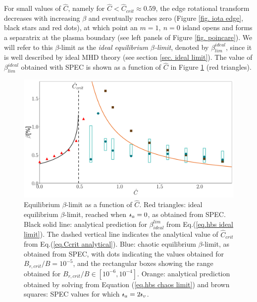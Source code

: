 \documentclass[my_thesis.tex]{subfiles}
\begin{document}
For small values of $\hat{C}$, namely for $\hat{C} < \hat{C}_{crit}\approx 0.59$, the edge rotational transform decreases with increasing $\beta$ and eventually reaches zero (Figure \ref{fig. iota edge}, black stars and red dots), at which point an $m=1,\ n=0$ island opens and forms a separatrix at the plasma boundary (see left panels of Figure \ref{fig. poincare}). We will refer to this $\beta$-limit as the \emph{ideal equilibrium $\beta$-limit}, denoted by $\beta_{lim}^{ideal}$, since it is well described by ideal MHD theory (see section \ref{sec. ideal limit}). The value of $\beta^{ideal}_{lim}$ obtained with SPEC is shown as a function of $\hat{C}$ in Figure \ref{fig. beta limits} (red triangles).



\begin{figure}
	\centering
	\includegraphics[width=\linewidth]{images/ClassicalStellaratorBetaLimit/beta_limit_dBr=1e-5_NoVacuum.pdf}
	\caption{Equilibrium $\beta$-limit as a function of $\hat{C}$. Red triangles: ideal equilibrium $\beta$-limit, reached when $\text{$\iota\!\!$-}_a=0$, as obtained from SPEC. Black solid line: analytical prediction for $\beta^{lim}_{ideal}$ from Eq.(\ref{eq.hbs ideal limit}). The dashed vertical line indicates the analytical value of $\hat{C}_{crit}$ from Eq.(\ref{eq.Ccrit analytical}). Blue: chaotic equilibrium $\beta$-limit, as obtained from SPEC, with dots indicating the values obtained for $ B_{r,crit}/B=10^{-5}$, and the rectangular boxes showing the range obtained for $ B_{r,crit}/B\in[10^{-6},10^{-4}]$. Orange: analytical prediction obtained by solving from Equation (\ref{eq.hbs chaos limit}) and brown squares: SPEC values for which $\text{$\iota\!\!$-}_a=2\text{$\iota\!\!$-}_v$.}
	\label{fig. beta limits}
\end{figure}
\end{document}
